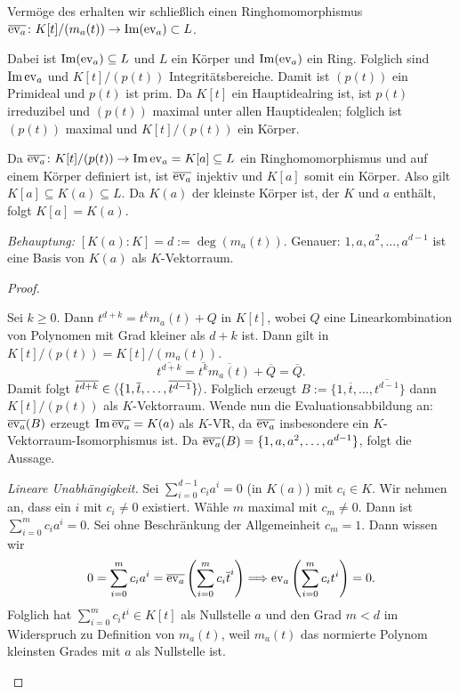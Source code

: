 \documentclass[12pt,a4paper]{scrartcl}
\begin{document}
\begin{description}
	Vermöge des  erhalten wir schließlich einen Ringhomomorphismus $\overline{\operatorname{ev}_a}\colon K[t]/(m_a(t))\to \operatorname{Im}(\operatorname{ev}_a)\subset L$.
	
	
	Dabei ist $\operatorname{Im}(\operatorname{ev}_a)\subseteq L$ und $L$ ein Körper und $\operatorname{Im}(\operatorname{ev}_a)$ ein Ring. Folglich sind $\operatorname{Im}\operatorname{ev}_a$ und $K[t]/(p(t))$ Integritätsbereiche. Damit ist $(p(t))$ ein Primideal und $p(t)$ ist prim. Da $K[t]$ ein Hauptidealring ist, ist $p(t)$ irreduzibel und $(p(t))$ maximal unter allen Hauptidealen; folglich ist $(p(t))$ maximal und $K[t]/(p(t))$ ein Körper.
	
	Da $\overline{\operatorname{ev}_a}\colon K[t]/(p(t))\to \operatorname{Im}\operatorname{ev}_a = K[a]\subseteq L$ ein Ringhomomorphismus und auf einem Körper definiert ist, ist $\overline{\operatorname{ev}_a}$ injektiv und $K[a]$ somit ein Körper. Also gilt $K[a]\subseteq K(a) \subseteq L$. Da $K(a)$ der kleinste Körper ist, der $K$ und $a$ enthält, folgt $K[a] = K(a)$.
	
	\emph{Behauptung:} $[K(a):K] = d := \deg(m_a(t))$. Genauer: $1, a, a^2,\dots, a^{d-1}$ ist eine Basis von $K(a)$ als $K$-Vektorraum.
	\begin{proof}
		\leavevmode
		\begin{description}
			\item[\emph{Erzeugendensystem.}] Sei $k\geq 0$. Dann $t^{d+k} = t^km_a(t)+Q$ in $K[t]$, wobei $Q$ eine Linearkombination von Polynomen mit Grad kleiner als $d+k$ ist. Dann gilt in $K[t]/(p(t)) = K[t]/(m_a(t))$.
			\[\overline{t^{d+k}} = \overline{t^k}\overline{m_a(t)} + \overline{Q} = \overline{Q}.\]
			Damit folgt $\overline{t^{d+k}} \in \langle \{1, \overline{t}, \dots, \overline{t^{d-1}}\}\rangle$. Folglich erzeugt $B :=  \{1, \overline{t}, \dots, \overline{t^{d-1}}\}$ dann $K[t]/(p(t))$ als $K$-Vektorraum. Wende nun die Evaluationsabbildung an:
			$\overline{\operatorname{ev}_a}(B)$ erzeugt $\operatorname{Im}\overline{\operatorname{ev}_a} = K(a)$ als $K$-VR, da $\overline{\operatorname{ev}_a}$ insbesondere ein $K$-Vektorraum-Isomorphismus ist. Da $\overline{\operatorname{ev}_a}(B) = \{1, a, a^2,\dots, a^{d-1}\}$, folgt die Aussage.
			\item{\emph{Lineare Unabhängigkeit.}} Sei $\sum_{i =0}^{d-1}c_ia^i = 0$ (in $K(a)$) mit $c_i\in K$. Wir nehmen an, dass ein $i$ mit $c_i\neq 0$ existiert. Wähle $m$ maximal mit $c_m \neq 0$. Dann ist $\sum_{i = 0}^{m}c_ia^i = 0$. Sei ohne Beschränkung der Allgemeinheit $c_m = 1$. Dann wissen wir
			\[0 = \sum_{i = 0}^m c_ia^i = \overline{\operatorname{ev}_a}\left(\sum_{i=0}^mc_i\overline{t}^i\right)\Longrightarrow \operatorname{ev}_a\left(\sum_{i=0}^m c_it^i\right) = 0.\]
			Folglich hat $\sum_{i=0}^mc_it^i\in K[t]$ als Nullstelle $a$ und den Grad $m <d$ im Widerspruch zu Definition von $m_a(t)$, weil $m_a(t)$ das normierte Polynom kleinsten Grades mit $a$ als Nullstelle ist.
		\end{description}
	\end{proof}
\end{description}
\end{document}
